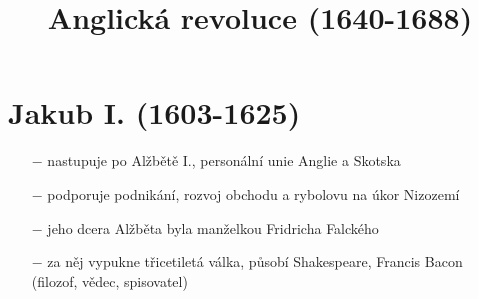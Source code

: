 \documentclass{article}
\title{\vspace{-2cm}Anglická revoluce (1640-1688)\vspace{-1.7cm}}
\date{}
\author{}
\begin{document}
\maketitle

\section*{Jakub I. (1603-1625)}
\begin{itemize}
    \vspace{-0.5em}
    \setlength\itemsep{0.15em}
    \item[$-$] nastupuje po Alžbětě I., personální unie Anglie a Skotska
    \item[$-$] podporuje podnikání, rozvoj obchodu a rybolovu na úkor Nizozemí
    \item[$-$] jeho dcera Alžběta byla manželkou Fridricha Falckého
    \item[$-$] za něj vypukne třicetiletá válka, působí Shakespeare, Francis Bacon (filozof, vědec, spisovatel)
\end{itemize}
\end{document}
